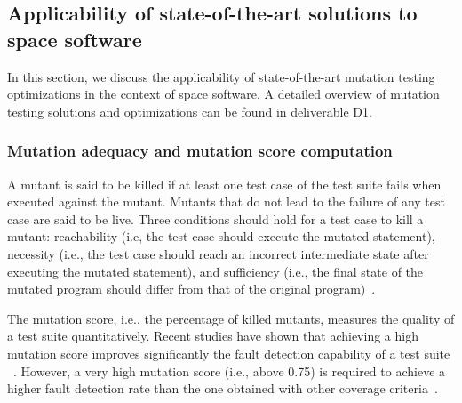 
\subsection{Applicability of state-of-the-art solutions to space software}
\label{sec:background}

In this section, we discuss the applicability of state-of-the-art mutation testing optimizations in the context of space software. A detailed overview of mutation testing solutions and optimizations can be found in deliverable D1.

\subsubsection{Mutation adequacy and mutation score computation}

A mutant is said to be killed if at least one test case of the test suite fails when executed against the mutant.
Mutants that do not lead to the failure of any test case are said to be live.
Three conditions should hold for a test case to kill a mutant: reachability (i.e, the test case should execute the mutated statement), necessity (i.e., the test case should reach an incorrect intermediate state after executing the mutated statement), and sufficiency (i.e., the final state of the mutated program should differ from that of the original program)~\cite{offutt1997automatically}.

The mutation score, i.e., the percentage of killed mutants, measures the quality of a test suite quantitatively. Recent studies have shown that achieving a high mutation score improves significantly the fault detection capability of a test suite
~\cite{papadakis2018mutation}. 
However, a very high mutation score (i.e., above 0.75) is required to achieve a higher fault detection rate than the one obtained with other coverage criteria~\cite{Chekam:17}.

